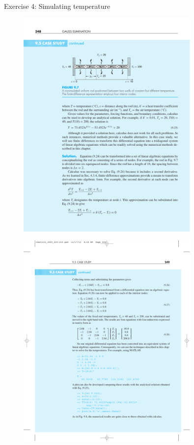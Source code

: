 \documentclass[xcolor=svgnames,t,10pt,allowframebreaks]{beamer}
\begin{document}
\begin{frame}[label={sec:org81f1c07}]{Exercise 4: Simulating temperature}
\vfill
\begin{figure}[H]

\includegraphics[width=0.8\textwidth]{fig/linear-example-04-T.pdf}
\end{figure}

\begin{figure}[H]

\includegraphics[width=0.8\textwidth]{fig/linear-example-04-T-B.pdf}
\end{figure}
\vfill
\end{frame}
\end{document}
